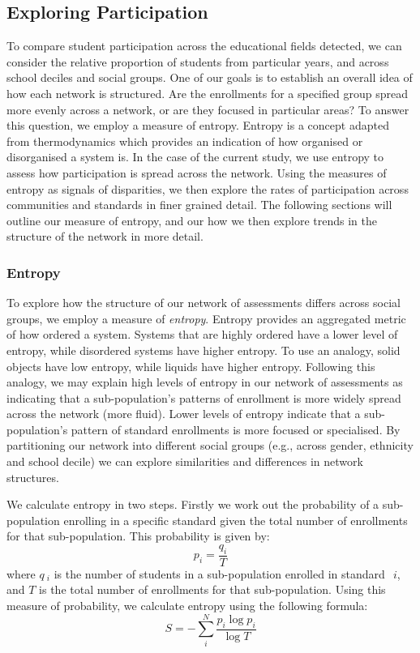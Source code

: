 \subsection{Exploring Participation}
To compare student participation across the educational fields detected, we can consider the relative proportion of students from particular years, and across school deciles and social groups. One of our goals is to establish an overall idea of how each network is structured. Are the enrollments for a specified group spread more evenly across a network, or are they focused in particular areas? To answer this question, we employ a measure of entropy. Entropy is a concept adapted from thermodynamics which provides an indication of how organised or disorganised a system is. In the case of the current study, we use entropy to assess how participation is spread across the network. Using the measures of entropy as signals of disparities, we then explore the rates of participation across communities and standards in finer grained detail. The following sections will outline our measure of entropy, and our how we then explore trends in the structure of the network in more detail. 

\subsubsection{Entropy}
To explore how the structure of our network of assessments differs across social groups, we employ a measure of \textit{entropy}. Entropy provides an aggregated metric of how ordered a system. Systems that are highly ordered have a lower level of entropy, while disordered systems have higher entropy. To use an analogy, solid objects have low entropy, while liquids have higher entropy. Following this analogy, we may explain high levels of entropy in our network of assessments as indicating that a sub-population's patterns of enrollment is more widely spread across the network (more fluid). Lower levels of entropy indicate that a sub-population's pattern of standard enrollments is more focused or specialised. By partitioning our network into different social groups (e.g., across gender, ethnicity and school decile) we can explore similarities and differences in network structures. 

We calculate entropy in two steps. Firstly we work out the probability of a sub-population enrolling in a specific standard given the total number of enrollments for that sub-population. This probability is given by:
$$p_i = \frac{q_i}{T}$$
where $q~_i$ is the number of students in a sub-population enrolled in standard~$~i$, and $T$ is the total number of enrollments for that sub-population. Using this measure of probability, we calculate entropy using the following formula: 
$$S = -\sum_{i}^{N}{
\frac{p_i\log{p_i}}{\log{T}}
}$$


